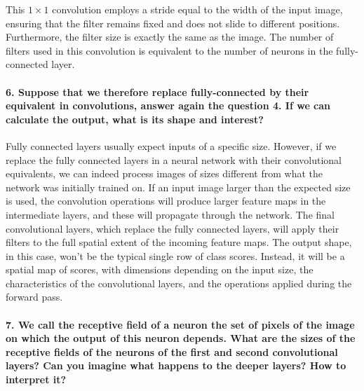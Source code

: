 \documentclass{article}
\theoremstyle{plain}%
\theoremstyle{definition}
\theoremstyle{remark}
\begin{document}
This $1 \times 1$ convolution employs a stride equal to the width of the input image, ensuring that the filter remains fixed and does not slide to different positions. Furthermore, the filter size is exactly the same as the image. The number of filters used in this convolution is equivalent to the number of neurons in the fully-connected layer.

\paragraph{6. Suppose that we therefore replace fully-connected by their equivalent in convolutions, answer again the question 4. If we can calculate the output, what is its shape and interest?}
Fully connected layers usually expect inputs of a specific size. However, if we replace the fully connected layers in a neural network with their convolutional equivalents, we can indeed process images of sizes different from what the network was initially trained on. If an input image larger than the expected size is used, the convolution operations will produce larger feature maps in the intermediate layers, and these will propagate through the network. The final convolutional layers, which replace the fully connected layers, will apply their filters to the full spatial extent of the incoming feature maps. The output shape, in this case, won't be the typical single row of class scores. Instead, it will be a spatial map of scores, with dimensions depending on the input size, the characteristics of the convolutional layers, and the operations applied during the forward pass.


\paragraph{7. We call the receptive field of a neuron the set of pixels of the image on which the output of this neuron depends. What are the sizes of the receptive fields of the neurons of the first and second convolutional layers? Can you imagine what happens to the deeper layers? How to interpret it?}
\end{document}
